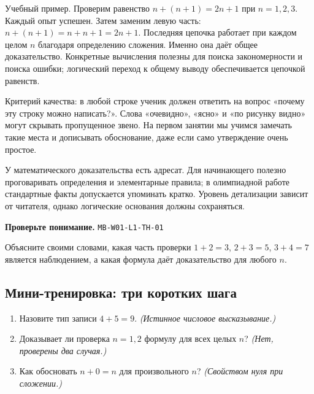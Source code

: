 \documentclass[11pt,a4paper,openany]{book}
\newcommand{\muid}[1]{\texttt{\footnotesize #1}}
\begin{document}
Учебный пример. Проверим равенство $n+(n+1)=2n+1$ при $n=1,2,3$. Каждый опыт успешен. Затем заменим левую часть: $n+(n+1)=n+n+1=2n+1$. Последняя цепочка работает при каждом целом $n$ благодаря определению сложения. Именно она даёт общее доказательство. Конкретные вычисления полезны для поиска закономерности и поиска ошибки; логический переход к общему выводу обеспечивается цепочкой равенств.


Критерий качества: в любой строке ученик должен ответить на вопрос «почему эту строку можно написать?». Слова «очевидно», «ясно» и «по рисунку видно» могут скрывать пропущенное звено. На первом занятии мы учимся замечать такие места и дописывать обоснование, даже если само утверждение очень простое.


У математического доказательства есть адресат. Для начинающего полезно проговаривать определения и элементарные правила; в олимпиадной работе стандартные факты допускается упоминать кратко. Уровень детализации зависит от читателя, однако логические основания должны сохраняться.


\begin{center}
\end{center}

\begin{learnbox}\textbf{Проверьте понимание.} \muid{MB-W01-L1-TH-01}\par Объясните своими словами, какая часть проверки $1+2=3$, $2+3=5$, $3+4=7$ является наблюдением, а какая формула даёт доказательство для любого $n$.\end{learnbox}

\subsection*{Мини-тренировка: три коротких шага}
\begin{enumerate}[label=\arabic*),leftmargin=*,itemsep=3pt]

\item Назовите тип записи $4+5=9$. \textit{(Истинное числовое высказывание.)}

\item Доказывает ли проверка $n=1,2$ формулу для всех целых $n$? \textit{(Нет, проверены два случая.)}

\item Как обосновать $n+0=n$ для произвольного $n$? \textit{(Свойством нуля при сложении.)}

\end{enumerate}
\end{document}
